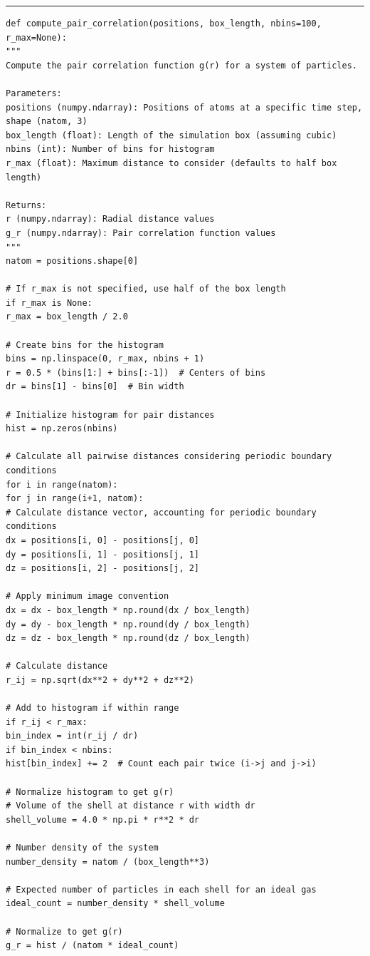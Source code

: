 \documentclass[a4paper]{article}
\begin{document}
\rule{\textwidth}{1pt}
{\small\begin{lstlisting}
def compute_pair_correlation(positions, box_length, nbins=100, r_max=None):
"""
Compute the pair correlation function g(r) for a system of particles.

Parameters:
positions (numpy.ndarray): Positions of atoms at a specific time step, shape (natom, 3)
box_length (float): Length of the simulation box (assuming cubic)
nbins (int): Number of bins for histogram
r_max (float): Maximum distance to consider (defaults to half box length)

Returns:
r (numpy.ndarray): Radial distance values
g_r (numpy.ndarray): Pair correlation function values
"""
natom = positions.shape[0]

# If r_max is not specified, use half of the box length
if r_max is None:
r_max = box_length / 2.0

# Create bins for the histogram
bins = np.linspace(0, r_max, nbins + 1)
r = 0.5 * (bins[1:] + bins[:-1])  # Centers of bins
dr = bins[1] - bins[0]  # Bin width

# Initialize histogram for pair distances
hist = np.zeros(nbins)

# Calculate all pairwise distances considering periodic boundary conditions
for i in range(natom):
for j in range(i+1, natom):
# Calculate distance vector, accounting for periodic boundary conditions
dx = positions[i, 0] - positions[j, 0]
dy = positions[i, 1] - positions[j, 1]
dz = positions[i, 2] - positions[j, 2]

# Apply minimum image convention
dx = dx - box_length * np.round(dx / box_length)
dy = dy - box_length * np.round(dy / box_length)
dz = dz - box_length * np.round(dz / box_length)

# Calculate distance
r_ij = np.sqrt(dx**2 + dy**2 + dz**2)

# Add to histogram if within range
if r_ij < r_max:
bin_index = int(r_ij / dr)
if bin_index < nbins:
hist[bin_index] += 2  # Count each pair twice (i->j and j->i)

# Normalize histogram to get g(r)
# Volume of the shell at distance r with width dr
shell_volume = 4.0 * np.pi * r**2 * dr

# Number density of the system
number_density = natom / (box_length**3)

# Expected number of particles in each shell for an ideal gas
ideal_count = number_density * shell_volume

# Normalize to get g(r)
g_r = hist / (natom * ideal_count)


\end{lstlisting}}
\end{document}
